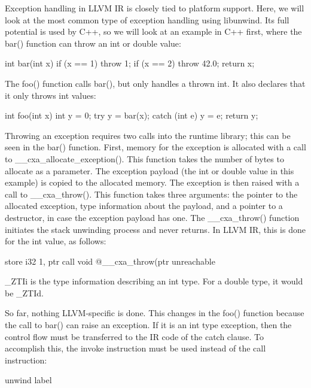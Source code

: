 Exception handling in LLVM IR is closely tied to platform support. Here, we will look at the most common type of exception handling using libunwind. Its full potential is used by C++, so we will look at an example in C++ first, where the bar() function can throw an int or double value:

\begin{cpp}
int bar(int x) {
    if (x == 1) throw 1;
    if (x == 2) throw 42.0;
    return x;
}
\end{cpp}

The foo() function calls bar(), but only handles a thrown int. It also declares that it only throws int values:

\begin{cpp}
int foo(int x) {
    int y = 0;
    try {
        y = bar(x);
    }
    catch (int e) {
        y = e;
    }
    return y;
}
\end{cpp}

Throwing an exception requires two calls into the runtime library; this can be seen in the bar() function. First, memory for the exception is allocated with a call to \_\_cxa\_allocate\_exception(). This function takes the number of bytes to allocate as a parameter. The exception payload (the int or double value in this example) is copied to the allocated memory. The exception is then raised with a call to \_\_cxa\_throw(). This function takes three arguments: the pointer to the allocated exception, type information about the payload, and a pointer to a destructor, in case the exception payload has one. The \_\_cxa\_throw() function initiates the stack unwinding process and never returns. In LLVM IR, this is done for the int value, as follows:

\begin{shell}
store i32 1, ptr %
call void @__cxa_throw(ptr %
unreachable
\end{shell}

\_ZTIi is the type information describing an int type. For a double type, it would be \_ZTId.

So far, nothing LLVM-specific is done. This changes in the foo() function because the call to bar() can raise an exception. If it is an int type exception, then the control flow must be transferred to the IR code of the catch clause. To accomplish this, the invoke instruction must be used instead of the call instruction:

\begin{shell}
                                 unwind label %
\end{shell}

